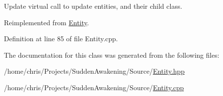 Update virtual call to update entities, and their child class. 



Reimplemented from \hyperlink{class_entity_a7e2a7c5df3bceaf41deea192eeba4d8f}{Entity}.



Definition at line 85 of file Entity.\-cpp.



The documentation for this class was generated from the following files\-:\begin{DoxyCompactItemize}
\item 
/home/chris/\-Projects/\-Sudden\-Awakening/\-Source/\hyperlink{_entity_8hpp}{Entity.\-hpp}\item 
/home/chris/\-Projects/\-Sudden\-Awakening/\-Source/\hyperlink{_entity_8cpp}{Entity.\-cpp}\end{DoxyCompactItemize}

